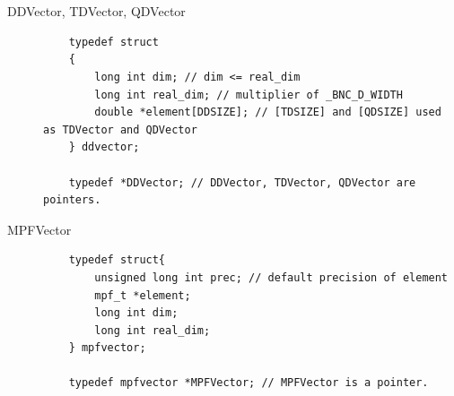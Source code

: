 \chapter{}\label{chap:basiclinear}

\section{}

\begin{description}
    \item[DDVector, TDVector, QDVector]\strut\par
    \begin{lstlisting}
    typedef struct
    {
        long int dim; // dim <= real_dim
        long int real_dim; // multiplier of _BNC_D_WIDTH
        double *element[DDSIZE]; // [TDSIZE] and [QDSIZE] used as TDVector and QDVector
    } ddvector;

    typedef *DDVector; // DDVector, TDVector, QDVector are pointers.
    \end{lstlisting}
 
    \item[MPFVector]\strut\par
    \begin{lstlisting}
    typedef struct{
        unsigned long int prec; // default precision of element
        mpf_t *element;
        long int dim;
        long int real_dim;
    } mpfvector;
    
    typedef mpfvector *MPFVector; // MPFVector is a pointer.
    \end{lstlisting}
    
\end{description}

